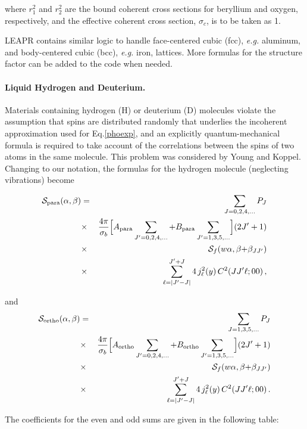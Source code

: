 \noindent
where $r_1^2$ and $r_2^2$ are the bound coherent cross sections for
beryllium and oxygen, respectively, and the effective coherent cross
section, $\sigma_c$, is to be taken as 1.

LEAPR contains similar logic to handle face-centered cubic (fcc),
{\it e.g.} aluminum,
and body-centered cubic (bcc), {\it e.g.} iron, lattices.  More formulas
for the structure factor can be added to the code when needed.

\paragraph{Liquid Hydrogen and Deuterium.}
Materials containing hydrogen (H) or deuterium (D) molecules violate the
assumption that spins are distributed randomly that underlies the
incoherent approximation used for Eq.\ref{phoexp}, and an explicitly
quantum-mechanical formula is required to take account of the correlations
between the spins of two atoms in the same molecule.  This problem was
considered by Young and Koppel\cite{YK}.  Changing to our notation, the
formulas for the hydrogen molecule (neglecting vibrations) become

\begin{eqnarray}
    {\cal S}_{\rm para}(\alpha,\beta)&=&\sum_{J=0,2,4,\dots}P_J \nonumber \\
      &\times&\frac{4\pi}{\sigma_b}\Bigl[A_{\rm para}\sum_{J'=0,2,4,\dots}
       +B_{\rm para}\sum_{J'=1,3,5,\dots}\Bigr](2 J'+1)\nonumber\\
      &\times&{\cal S}_f(w\alpha,\beta{+}\beta_{JJ'})\nonumber\\
      &\times&\sum_{\ell=|J'-J|}^{J'+J}4\,j_\ell^2(y)\,C^2(JJ'\ell;00)\,,
\label{spara}
\end{eqnarray}

\noindent
and
\begin{eqnarray}
    {\cal S}_{\rm ortho}(\alpha,\beta)&=&\sum_{J=1,3,5,\dots}P_J\nonumber\\
      &\times&\frac{4\pi}{\sigma_b}\Bigl[A_{\rm ortho}\sum_{J'=0,2,4,\dots}
       +B_{\rm ortho}\sum_{J'=1,3,5,\dots}\Bigr](2 J'+1)\nonumber\\
      &\times&{\cal S}_f(w\alpha,\beta{+}\beta_{JJ'})\nonumber\\
      &\times&\sum_{\ell=|J'-J|}^{J'+J}4\,j_\ell^2(y)\,C^2(JJ'\ell;00)\,.
\label{sortho}
\end{eqnarray}

\noindent
The coefficients for the even and odd sums are given in the following table:

